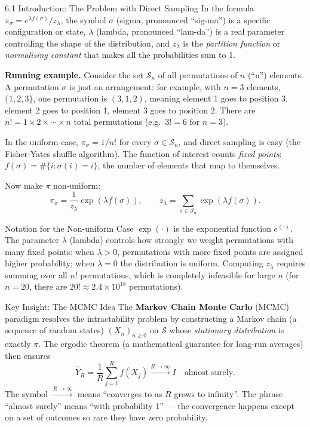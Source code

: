 \documentclass[aspectratio=169,10pt]{beamer}
\begin{document}
\begin{frame}[allowframebreaks]{6.1 Introduction: The Problem with Direct Sampling}
In the formula $\pi_\sigma = e^{\lambda f(\sigma)}/z_\lambda$, the symbol $\sigma$ (sigma, pronounced ``sig-ma'') is a specific configuration or state, $\lambda$ (lambda, pronounced ``lam-da'') is a real parameter controlling the shape of the distribution, and $z_\lambda$ is the \emph{partition function} or \emph{normalising constant} that makes all the probabilities sum to 1.

\framebreak

\textbf{Running example.}
Consider the set $\mathcal{S}_n$ of all permutations of $n$ (``n'') elements.
A permutation $\sigma$ is just an arrangement: for example, with $n=3$ elements, $\{1,2,3\}$, one permutation is $(3,1,2)$, meaning element 1 goes to position 3, element 2 goes to position 1, element 3 goes to position 2.
There are $n! = 1 \times 2 \times \cdots \times n$ total permutations (e.g.\ $3! = 6$ for $n=3$).

In the uniform case, $\pi_\sigma = 1/n!$ for every $\sigma \in \mathcal{S}_n$, and direct sampling is easy (the Fisher-Yates shuffle algorithm).
The function of interest counts \emph{fixed points}: $f(\sigma) = \#\{i : \sigma(i) = i\}$, the number of elements that map to themselves.

Now make $\pi$ non-uniform:
\[
  \pi_\sigma = \frac{1}{z_\lambda} \exp(\lambda f(\sigma)), \qquad z_\lambda = \sum_{\sigma \in \mathcal{S}_n} \exp(\lambda f(\sigma)).
\]

\begin{block}{Notation for the Non-uniform Case}
$\exp(\cdot)$ is the exponential function $e^{(\cdot)}$.
The parameter $\lambda$ (lambda) controls how strongly we weight permutations with many fixed points: when $\lambda > 0$, permutations with more fixed points are assigned higher probability; when $\lambda = 0$ the distribution is uniform.
Computing $z_\lambda$ requires summing over all $n!$ permutations, which is completely infeasible for large $n$ (for $n = 20$, there are $20! \approx 2.4 \times 10^{18}$ permutations).
\end{block}

\framebreak

\begin{alertblock}{Key Insight: The MCMC Idea}
The \textbf{Markov Chain Monte Carlo} (MCMC) paradigm resolves the intractability problem by constructing a Markov chain (a sequence of random states) $(X_n)_{n \ge 0}$ on $\mathcal{S}$ whose \emph{stationary distribution} is exactly $\pi$.
The ergodic theorem (a mathematical guarantee for long-run averages) then ensures
\[
  \hat{Y}_R = \frac{1}{R} \sum_{j=1}^{R} f(X_j) \xrightarrow{R \to \infty} I \quad \text{almost surely.}
\]
The symbol $\xrightarrow{R \to \infty}$ means ``converges to as $R$ grows to infinity''.
The phrase ``almost surely'' means ``with probability 1'' --- the convergence happens except on a set of outcomes so rare they have zero probability.


\end{alertblock}
\end{frame}
\end{document}
